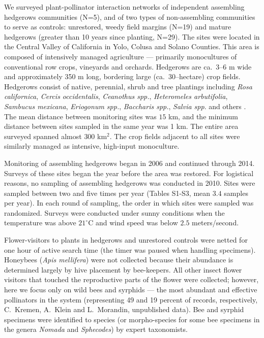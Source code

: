 \documentclass[12pt]{article}
\begin{document}
We surveyed plant-pollinator interaction networks of independent
assembling hedgerows communities (N=5), and of two types of
non-assembling communities to serve as controls: unrestored, weedy
field margins (N=19) and mature hedgerows (greater than 10 years since
planting, N=29). The sites were located in the Central Valley of
California in Yolo, Colusa and Solano Counties. This area is composed
of intensively managed agriculture --- primarily monocultures of
conventional row crops, vineyards and orchards. Hedgerows are ca.~3--6
m wide and approximately 350 m long, bordering large (ca.\
30--hectare) crop fields. Hedgerows consist of native, perennial,
shrub and tree plantings including \textit{Rosa californica},
\textit{Cercis occidentalis}, \textit{Ceanothus spp.},
\textit{Heteromeles arbutifolia}, \textit{Sambucus mexicana},
\textit{Eriogonum spp.}, \textit{Baccharis spp.}, \textit{Salvia
  spp}. and others \citep[Fig.~S1][]{menz-2010-4, kremen-2015-602,
  mgonigle-2015-x}. The mean distance between monitoring sites was
$15$ km, and the minimum distance between sites sampled in the same
year was 1 km.  The entire area surveyed spanned almost $300$
km$^2$. The crop fields adjacent to all sites were similarly managed
as intensive, high-input monoculture.

Monitoring of assembling hedgerows began in 2006 and continued through
2014. Surveys of these sites began the year before the area was
restored. For logistical reasons, no sampling of assembling hedgerows
was conducted in 2010. Sites were sampled between two and five times
per year (Tables S1-S3, mean $3.4$ samples per year). In each round of
sampling, the order in which sites were sampled was
randomized. Surveys were conducted under sunny conditions when the
temperature was above $21^{\circ}\mathrm{C}$ and wind speed was below
$2.5$ meters/second.

Flower-visitors to plants in hedgerows and unrestored controls were
netted for one hour of active search time (the timer was paused when
handling specimens). Honeybees (\textit{Apis mellifera}) were not
collected because their abundance is determined largely by hive
placement by bee-keepers. All other insect flower visitors that
touched the reproductive parts of the flower were collected; however,
here we focus only on wild bees and syrphids --- the most abundant and
effective pollinators in the system (representing 49 and 19 percent of
records, respectively, C.~Kremen, A.~Klein and L.~Morandin,
unpublished data). Bee and syrphid specimens were identified to
species (or morpho-species for some bee specimens in the genera
\textit{Nomada} and \textit{Sphecodes}) by expert taxonomists.
\end{document}
